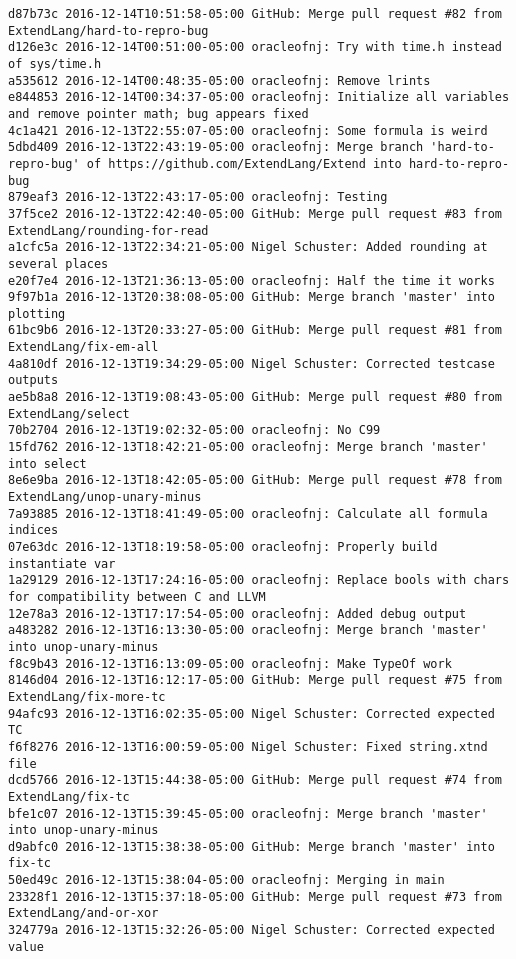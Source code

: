 \begin{lstlisting}
d87b73c 2016-12-14T10:51:58-05:00 GitHub: Merge pull request #82 from ExtendLang/hard-to-repro-bug
d126e3c 2016-12-14T00:51:00-05:00 oracleofnj: Try with time.h instead of sys/time.h
a535612 2016-12-14T00:48:35-05:00 oracleofnj: Remove lrints
e844853 2016-12-14T00:34:37-05:00 oracleofnj: Initialize all variables and remove pointer math; bug appears fixed
4c1a421 2016-12-13T22:55:07-05:00 oracleofnj: Some formula is weird
5dbd409 2016-12-13T22:43:19-05:00 oracleofnj: Merge branch 'hard-to-repro-bug' of https://github.com/ExtendLang/Extend into hard-to-repro-bug
879eaf3 2016-12-13T22:43:17-05:00 oracleofnj: Testing
37f5ce2 2016-12-13T22:42:40-05:00 GitHub: Merge pull request #83 from ExtendLang/rounding-for-read
a1cfc5a 2016-12-13T22:34:21-05:00 Nigel Schuster: Added rounding at several places
e20f7e4 2016-12-13T21:36:13-05:00 oracleofnj: Half the time it works
9f97b1a 2016-12-13T20:38:08-05:00 GitHub: Merge branch 'master' into plotting
61bc9b6 2016-12-13T20:33:27-05:00 GitHub: Merge pull request #81 from ExtendLang/fix-em-all
4a810df 2016-12-13T19:34:29-05:00 Nigel Schuster: Corrected testcase outputs
ae5b8a8 2016-12-13T19:08:43-05:00 GitHub: Merge pull request #80 from ExtendLang/select
70b2704 2016-12-13T19:02:32-05:00 oracleofnj: No C99
15fd762 2016-12-13T18:42:21-05:00 oracleofnj: Merge branch 'master' into select
8e6e9ba 2016-12-13T18:42:05-05:00 GitHub: Merge pull request #78 from ExtendLang/unop-unary-minus
7a93885 2016-12-13T18:41:49-05:00 oracleofnj: Calculate all formula indices
07e63dc 2016-12-13T18:19:58-05:00 oracleofnj: Properly build instantiate var
1a29129 2016-12-13T17:24:16-05:00 oracleofnj: Replace bools with chars for compatibility between C and LLVM
12e78a3 2016-12-13T17:17:54-05:00 oracleofnj: Added debug output
a483282 2016-12-13T16:13:30-05:00 oracleofnj: Merge branch 'master' into unop-unary-minus
f8c9b43 2016-12-13T16:13:09-05:00 oracleofnj: Make TypeOf work
8146d04 2016-12-13T16:12:17-05:00 GitHub: Merge pull request #75 from ExtendLang/fix-more-tc
94afc93 2016-12-13T16:02:35-05:00 Nigel Schuster: Corrected expected TC
f6f8276 2016-12-13T16:00:59-05:00 Nigel Schuster: Fixed string.xtnd file
dcd5766 2016-12-13T15:44:38-05:00 GitHub: Merge pull request #74 from ExtendLang/fix-tc
bfe1c07 2016-12-13T15:39:45-05:00 oracleofnj: Merge branch 'master' into unop-unary-minus
d9abfc0 2016-12-13T15:38:38-05:00 GitHub: Merge branch 'master' into fix-tc
50ed49c 2016-12-13T15:38:04-05:00 oracleofnj: Merging in main
23328f1 2016-12-13T15:37:18-05:00 GitHub: Merge pull request #73 from ExtendLang/and-or-xor
324779a 2016-12-13T15:32:26-05:00 Nigel Schuster: Corrected expected value

\end{lstlisting}
